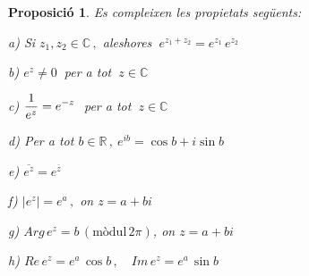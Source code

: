 \documentclass[12pt]{article}
\newtheorem{proposicio}{Proposici{\'o}}[subsection]
\newcommand{\R}{\mathbb{R}}
\newcommand{\C}{\mathbb{C}}
\begin{document}
\vspace{0.4cm}
\begin{proposicio}\label{propiexponencial}
Es compleixen les propietats seg{\"u}ents:
\item[a)] Si $z_1,z_2\in\C\,,$ aleshores $\ e^{z_1+z_2} = e^{z_1}\, e^{z_2}$
\item[b)] $e^z \not= 0\ $ per a tot $\ z\in\C$
\item[c)] $\displaystyle{1\over e^z}= e^{-z}\ $ per a tot $\ z\in\C$
\item[d)] Per a tot $b\in\R\,,\ e^{ib}= \cos b + i\sin b$
\item[e)] $\overline{e^{z}}=e^{\overline{z}}$
\item[f)] $\left| e^z\right| = e^a\,,$ on $z=a+bi$
\item[g)] $Arg \, e^z=b\, (\mbox{m{\`o}dul}\, 2\pi )$, on $z=a+bi$
\item[h)] $Re\, e^z = e^a\, \cos b\,,\quad Im\, e^z =e^a\, \sin b$
\end{proposicio}
\end{document}
